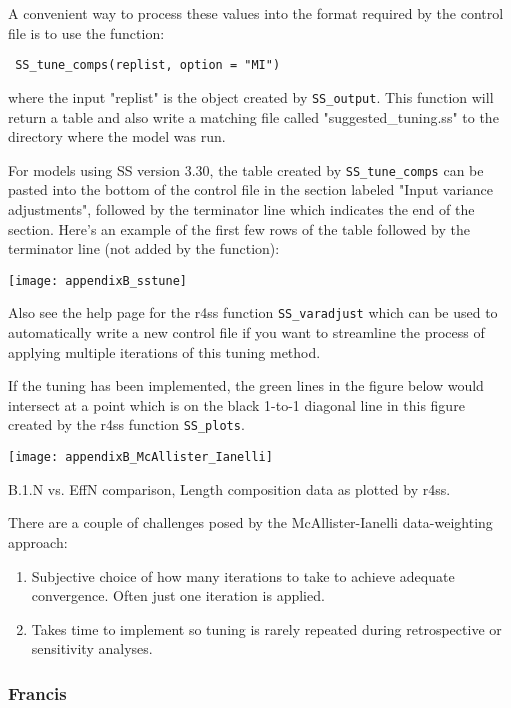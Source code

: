 A convenient way to process these values into the format required by the control file is to use the function:

\texttt{ SS\_tune\_comps(replist, option = "MI") }

where the input "replist" is the object created by \texttt{SS\_output}. This function will return a table and also write a matching file called "suggested\_tuning.ss" to the directory where the model was run.

For models using SS version 3.30, the table created by \texttt{SS\_tune\_comps} can be pasted into the bottom of the control file in the section labeled "Input variance adjustments", followed by the terminator line which indicates the end of the section. Here's an example of the first few rows of the table followed by the terminator line (not added by the function):

\begin{center}
	\texttt{[image: appendixB\_sstune]}\\
\end{center}

Also see the help page for the r4ss function \texttt{SS\_varadjust} which can be used to automatically write a new control file if you want to streamline the process of applying multiple iterations of this tuning method.

If the tuning has been implemented, the green lines in the figure below would intersect at a point which is on the black 1-to-1 diagonal line in this figure created by the r4ss function \texttt{SS\_plots}.

\begin{center}
	\texttt{[image: appendixB\_McAllister\_Ianelli]}\\
\end{center}
\figurename{ B.1.N vs. EffN comparison, Length composition data as plotted by r4ss.}

There are a couple of challenges posed by the McAllister-Ianelli data-weighting approach:
\begin{enumerate}
	\item Subjective choice of how many iterations to take to achieve adequate convergence. Often just one iteration is applied.
	
	\item Takes time to implement so tuning is rarely repeated during retrospective or sensitivity analyses.
\end{enumerate}

\subsubsection{Francis}

